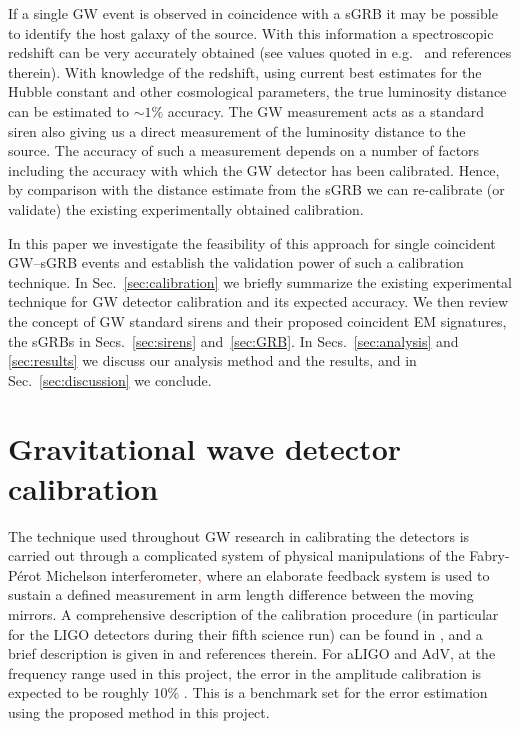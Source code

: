 \documentclass[prd, twocolumn, lengthcheck, superscriptaddress, showpacs, letterpaper, nofootinbib]{revtex4-1}
\newcommand{\refresp}[1]{\textcolor{red}{#1}}
\begin{document}
If a single \ac{GW} event is observed in coincidence with a \ac{sGRB} it may be
possible to identify the host galaxy of the source.  With this
information a spectroscopic redshift can be very accurately obtained (see
values quoted in e.g.\ \cite{0004-637X-664-2-1000} and references therein). With
knowledge of the redshift, using current best estimates for the Hubble constant
and other cosmological parameters, the true luminosity distance can be
estimated to $\sim 1\%$ accuracy.  The \ac{GW} measurement acts as a standard
siren also giving us a direct measurement of the luminosity distance to the
source. The accuracy of such a measurement depends on a number of factors
including the accuracy with which the \ac{GW} detector has been calibrated.
Hence, by comparison with the distance estimate from the \ac{sGRB} we can
re-calibrate (or validate) the existing experimentally obtained calibration. 

In this paper we investigate the feasibility of this approach for single coincident 
\ac{GW}--\ac{sGRB} events and establish the validation power of such a calibration technique.  In 
Sec.~\ref{sec:calibration} we briefly summarize the existing experimental technique for \ac{GW} 
detector calibration and its expected accuracy.  We then review the concept of \ac{GW} standard 
sirens and their proposed coincident \ac{EM} signatures, the \acp{sGRB} in
Secs.~\ref{sec:sirens} and~\ref{sec:GRB}. In Secs.~\ref{sec:analysis} and \ref{sec:results} we 
discuss our analysis method and the results, and in Sec.~\ref{sec:discussion} we 
conclude.    

\section{Gravitational wave detector calibration\label{sec:calibration}}

The technique used throughout \ac{GW} research in calibrating the detectors is carried out through 
a complicated system of physical manipulations of the Fabry-P\'{e}rot Michelson interferometer\refresp{,}
where an elaborate feedback system is used to sustain a defined measurement in arm length 
difference between the moving mirrors. A comprehensive description of the calibration procedure (in 
particular for the LIGO detectors during their fifth science run) can be found in 
\cite{2010NIMPA.624..223A}, and a brief description is given in \cite{Vitale:2012} and references 
therein. For \ac{aLIGO} and \ac{AdV}, at the frequency range used in this project, the error in the 
amplitude calibration is expected to be roughly $10\%$ \cite{Vitale:2012}. This is a benchmark set 
for the error estimation using the proposed method in this project.
\end{document}
